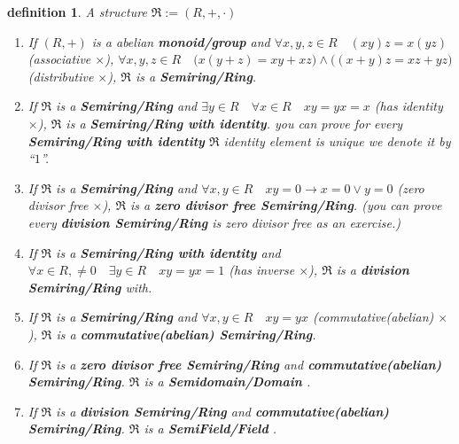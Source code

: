 \documentclass[10pt,a4paper]{book}
\newtheorem{definition}{definition}[section]
\begin{document}
\begin{definition}
    A structure $\mathfrak{R} := (R , + ,  \cdot) $
    \begin{enumerate}
        \setlength{\itemsep}{0pt} %
        \item       If $(R , + )$ is a abelian \textbf{monoid/group} and $\forall x ,y ,z \in R
                  \quad (x y ) z = x (y z ) $ (associative $\times$), $\forall x ,y ,z \in R
                  \quad \Big(x (y + z ) = x y + x z \Big) \land \Big((x + y ) z = x z + y z \Big)
              $ (distributive $\times$), $\mathfrak{R}$ is a \textbf{Semiring/Ring}.
        \item       If $\mathfrak{R}$ is a \textbf{Semiring/Ring} and $ \exists y \in R \quad
                  \forall x \in R \quad x y = y x = x$ (has identity $\times$), $\mathfrak{R}$ is
              a \textbf{Semiring/Ring with identity}. you can prove for every
              \textbf{Semiring/Ring with identity} $\mathfrak{R}$ identity element is unique
              we denote it by ``$1$''.
        \item       If $\mathfrak{R}$ is a \textbf{Semiring/Ring} and $\forall x ,y \in R \quad x y
                  = 0 \to x = 0 \lor y = 0 $ (zero divisor free $\times$), $\mathfrak{R}$ is a
              \textbf{zero divisor free Semiring/Ring}. (you can prove every \textbf{division
                  Semiring/Ring} is zero divisor free as an exercise.)
        \item       If $\mathfrak{R}$ is a \textbf{Semiring/Ring with identity} and $\forall x \in
                  R, \not= 0 \quad \exists y \in R \quad x y = y x = 1$ (has inverse $\times$),
              $\mathfrak{R}$ is a \textbf{division Semiring/Ring} with.
        \item       If $\mathfrak{R}$ is a \textbf{Semiring/Ring} and $\forall x ,y \in R \quad x y
                  = y x $ (commutative(abelian) $\times$), $\mathfrak{R}$ is a
              \textbf{commutative(abelian) Semiring/Ring}.
        \item       If $\mathfrak{R}$ is a \textbf{zero divisor free Semiring/Ring} and
              \textbf{commutative(abelian) Semiring/Ring}. $\mathfrak{R}$ is a \textbf{
                  Semidomain/Domain }.
        \item       If $\mathfrak{R}$ is a \textbf{division Semiring/Ring} and
              \textbf{commutative(abelian) Semiring/Ring}. $\mathfrak{R}$ is a \textbf{
                  SemiField/Field }.

    \end{enumerate}

\end{definition}
\end{document}
